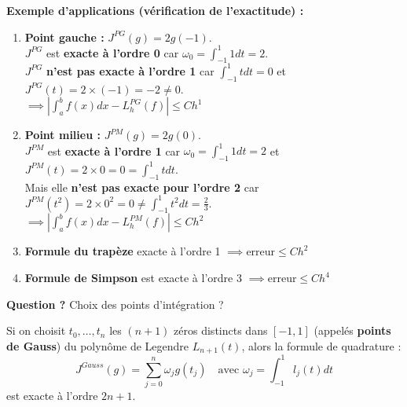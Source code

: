 \textbf{Exemple d'applications (vérification de l'exactitude) :}
\begin{enumerate}
    \item \textbf{Point gauche :} $J^{PG}(g) = 2g(-1)$. \\
    $J^{PG}$ est \textbf{exacte à l'ordre 0} car $\omega_0 = \int_{-1}^1 1 dt = 2$. \\
    $J^{PG}$ \textbf{n'est pas exacte à l'ordre 1} car $\int_{-1}^1 t dt = 0$ et $J^{PG}(t) = 2 \times (-1) = -2 \neq 0$. \\
    $\implies \left| \int_a^b f(x)dx - L_h^{PG}(f) \right| \le C h^1$
    
    \item \textbf{Point milieu :} $J^{PM}(g) = 2g(0)$. \\
    $J^{PM}$ est \textbf{exacte à l'ordre 1} car $\omega_0 = \int_{-1}^1 1 dt = 2$ et $J^{PM}(t) = 2 \times 0 = 0 = \int_{-1}^1 t dt$. \\
    Mais elle \textbf{n'est pas exacte pour l'ordre 2} car $J^{PM}(t^2) = 2 \times 0^2 = 0 \neq \int_{-1}^1 t^2 dt = \frac{2}{3}$. \\
    $\implies \left| \int_a^b f(x)dx - L_h^{PM}(f) \right| \le C h^2$
    
    \item \textbf{Formule du trapèze} exacte à l'ordre 1 $\implies \text{erreur} \le C h^2$
    \item \textbf{Formule de Simpson} est exacte à l'ordre 3 $\implies \text{erreur} \le C h^4$
\end{enumerate}

\begin{explication}
\textbf{Question ?} Choix des points d'intégration ?

Si on choisit $t_0, \dots, t_n$ les $(n+1)$ zéros distincts dans $[-1, 1]$ (appelés \textbf{points de Gauss}) du polynôme de Legendre $L_{n+1}(t)$, alors la formule de quadrature :
$$J^{Gauss}(g) = \sum_{j=0}^n \omega_j g(t_j) \quad \text{avec } \omega_j = \int_{-1}^1 l_j(t)dt$$
est exacte à l'ordre \textbf{$2n+1$}.
\end{explication}
